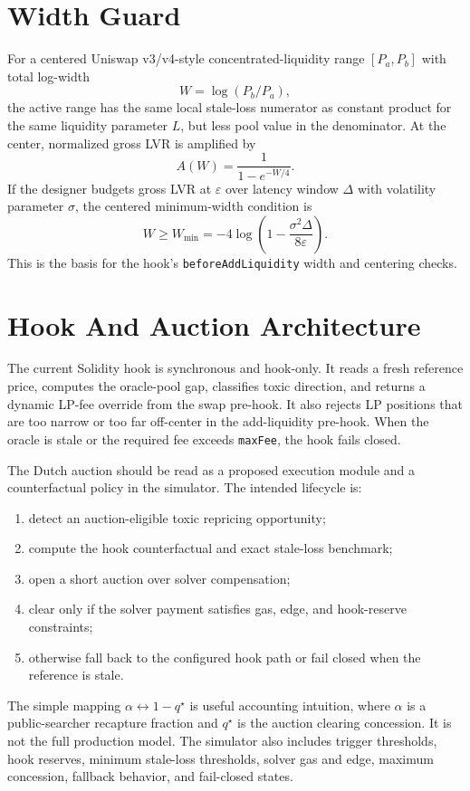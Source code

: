 \documentclass[11pt]{article}
\begin{document}
\section{Width Guard}

For a centered Uniswap v3/v4-style concentrated-liquidity range $[P_a,P_b]$ with total log-width
\[
  W=\log(P_b/P_a),
\]
the active range has the same local stale-loss numerator as constant product for the same liquidity parameter $L$, but less pool value in the denominator. At the center, normalized gross LVR is amplified by
\[
  A(W)=\frac{1}{1-e^{-W/4}}.
\]
If the designer budgets gross LVR at $\varepsilon$ over latency window $\Delta$ with volatility parameter $\sigma$, the centered minimum-width condition is
\[
  W \geq W_{\min}=-4\log\!\left(1-\frac{\sigma^2\Delta}{8\varepsilon}\right).
\]
This is the basis for the hook's \texttt{beforeAddLiquidity} width and centering checks.

\section{Hook And Auction Architecture}

The current Solidity hook is synchronous and hook-only. It reads a fresh reference price, computes the oracle-pool gap, classifies toxic direction, and returns a dynamic LP-fee override from the swap pre-hook. It also rejects LP positions that are too narrow or too far off-center in the add-liquidity pre-hook. When the oracle is stale or the required fee exceeds \texttt{maxFee}, the hook fails closed.

The Dutch auction should be read as a proposed execution module and a counterfactual policy in the simulator. The intended lifecycle is:

\begin{enumerate}
  \item detect an auction-eligible toxic repricing opportunity;
  \item compute the hook counterfactual and exact stale-loss benchmark;
  \item open a short auction over solver compensation;
  \item clear only if the solver payment satisfies gas, edge, and hook-reserve constraints;
  \item otherwise fall back to the configured hook path or fail closed when the reference is stale.
\end{enumerate}

The simple mapping $\alpha \leftrightarrow 1-q^\star$ is useful accounting intuition, where $\alpha$ is a public-searcher recapture fraction and $q^\star$ is the auction clearing concession. It is not the full production model. The simulator also includes trigger thresholds, hook reserves, minimum stale-loss thresholds, solver gas and edge, maximum concession, fallback behavior, and fail-closed states.
\end{document}
